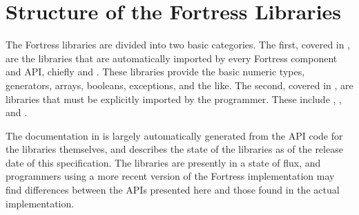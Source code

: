 %
%
%
%

\chapter{Structure of the Fortress Libraries}

The Fortress libraries are divided into two basic categories.  The
first, covered in , are the libraries that
are automatically imported by every Fortress component and API,
chiefly  and .  These
libraries provide the basic numeric types, generators, arrays,
booleans, exceptions, and the like.  The second, covered in
, are libraries that must be explicitly
imported by the programmer.  These include , , and
.

The documentation in  is largely automatically
generated from the API code for the libraries themselves, and
describes the state of the libraries as of the release date of this
specification.  The libraries are presently in a state of flux, and
programmers using a more recent version of the Fortress implementation
may find differences between the APIs presented here and those found
in the actual implementation.
